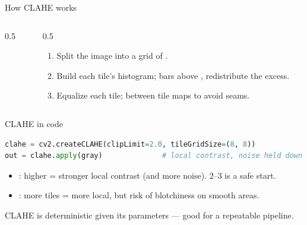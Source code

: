 \documentclass[10pt,aspectratio=169]{beamer}
\begin{document}
\begin{frame}{How CLAHE works}
  \begin{columns}[T]
    \begin{column}{0.5\textwidth}
    \begin{center}
    \end{center}
    \end{column}
    \begin{column}{0.5\textwidth}
      \begin{enumerate}
        \item Split the image into a grid of .
        \item Build each tile's histogram;  bars above , redistribute the excess.
        \item Equalize each tile;  between tile maps to avoid seams.
      \end{enumerate}
    \end{column}
  \end{columns}
\end{frame}

\begin{frame}[fragile]{CLAHE in code}
\begin{lstlisting}[language=Python]
clahe = cv2.createCLAHE(clipLimit=2.0, tileGridSize=(8, 8))
out = clahe.apply(gray)              # local contrast, noise held down
\end{lstlisting}
  \begin{itemize}
    \item {}: higher = stronger local contrast (and more noise). 2--3 is a safe start.
    \item {}: more tiles = more local, but risk of blotchiness on smooth areas.
  \end{itemize}
  \begin{infobox}
    CLAHE is deterministic given its parameters — good for a repeatable pipeline.
  \end{infobox}
\end{frame}
\end{document}
